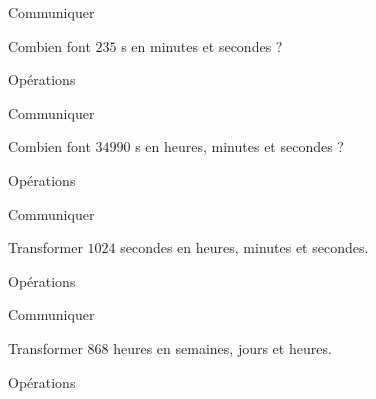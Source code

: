 \begin{pageAD}


 
\begin{ExoCad}{Communiquer}

\begin{minipage}{0.58\linewidth}
Combien font $235$ s en minutes et secondes ? 
 
\end{minipage}
\hfill
\vrule
\hfill
\begin{minipage}{0.38\linewidth}
Opérations
\vspace{2.5cm}
\end{minipage}

\end{ExoCad}
 

\begin{ExoCad}{Communiquer}

\begin{minipage}{0.58\linewidth}
Combien font $34 990$ s en heures, minutes et secondes ? 
 
\end{minipage}
\hfill
\vrule
\hfill
\begin{minipage}{0.38\linewidth}
Opérations
\vspace{2.5cm}
\end{minipage}

\end{ExoCad}

 
\begin{ExoCad}{Communiquer}

\begin{minipage}{0.58\linewidth}
Transformer $1024$ secondes en heures, minutes et secondes. 
 
\end{minipage}
\hfill
\vrule
\hfill
\begin{minipage}{0.38\linewidth}
Opérations
\vspace{2.5cm}
\end{minipage}


\end{ExoCad}

\begin{ExoCad}{Communiquer}

\begin{minipage}{0.58\linewidth}
Transformer 868 heures en semaines, jours et heures. 
 
\end{minipage}
\hfill
\vrule
\hfill
\begin{minipage}{0.38\linewidth}
Opérations
\vspace{2.5cm}
\end{minipage}


\end{ExoCad}


\end{pageAD}


